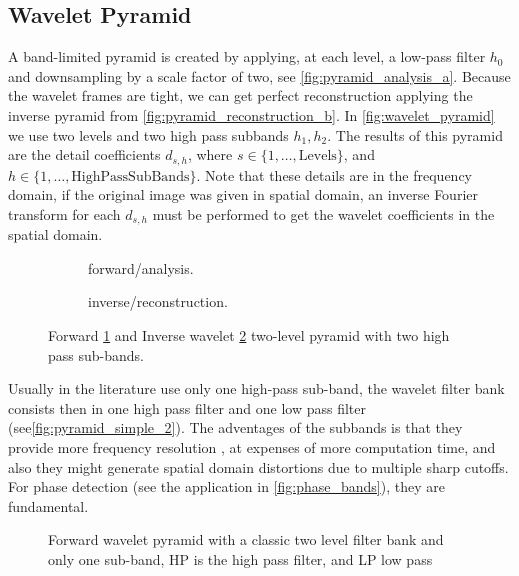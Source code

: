 \documentclass{InsightArticle}
\theoremstyle{definition}
\begin{document}
\subsection{Wavelet Pyramid}
\label{sub:wavelet_pyramid}

A band-limited pyramid is created by applying, at each level, a low-pass filter $h_0$ and downsampling by a scale factor of two, see \autoref{fig:pyramid_analysis_a}. Because the wavelet frames are tight, we can get perfect reconstruction applying the inverse pyramid from \autoref{fig:pyramid_reconstruction_b}. In \autoref{fig:wavelet_pyramid} we use two levels and two high pass subbands $h_1, h_2$. The results of this pyramid are the detail coefficients $d_{s,h}$, where $s \in \{1,\ldots, \text{Levels}\}$, and $h \in \{1,\ldots, \text{HighPassSubBands}\}$. Note that these details are in the frequency domain, if the original image was given in spatial domain, an inverse Fourier transform for each $d_{s,h}$ must be performed to get the wavelet coefficients in the spatial domain.

\begin{figure}[H]
  \begin{subfigure}[t]{\textwidth}
    \centering
    
    \captionsetup{width=0.8\textwidth}
    \caption{forward/analysis.}
    \label{fig:pyramid_analysis_a}
  \end{subfigure}
  \vspace*{\floatsep}
  \begin{subfigure}[t]{\textwidth}
    \centering
    
    \captionsetup{width=0.8\textwidth}
    \caption{inverse/reconstruction.}
    \label{fig:pyramid_reconstruction_b}
  \end{subfigure}
  \caption{Forward \ref{fig:pyramid_analysis_a} and Inverse wavelet \ref{fig:pyramid_reconstruction_b} two-level pyramid with two high pass sub-bands.}
  \label{fig:wavelet_pyramid}
\end{figure}

Usually in the literature use only one high-pass sub-band, the wavelet filter bank consists then in one high pass filter and one low pass filter (see\autoref{fig:pyramid_simple_2}). The adventages of the subbands is that they provide more frequency resolution \cite{held_steerable_2010}, at expenses of more computation time, and also they might generate spatial domain distortions due to multiple sharp cutoffs. For phase detection (see the application in \autoref{fig:phase_bands}), they are fundamental.
\begin{figure}[H]
  \centering
  
  \caption{Forward wavelet pyramid with a classic two level filter bank and only one sub-band, HP is the high pass filter, and LP low pass}
  \label{fig:pyramid_simple_2}
\end{figure}
\end{document}
